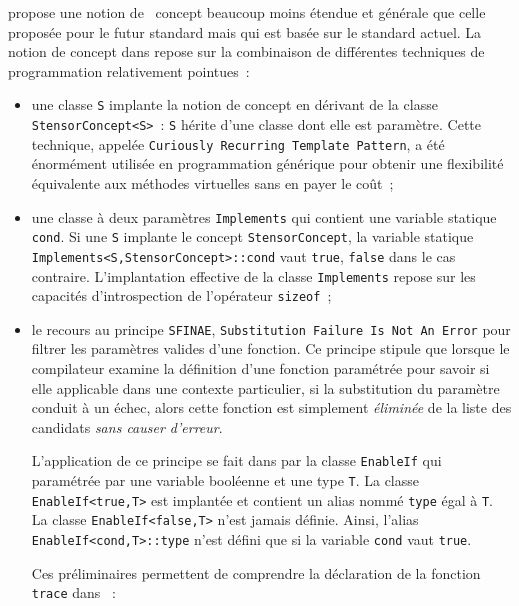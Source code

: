 \documentclass[rectoverso,pleiades,pstricks,leqno,anti]{texmf/note_technique_2010}
\newcommand{\tfel}[1]{\index{tfel}{#1}{\texttt{#1}}}
\newcommand{\varcpp}[1]{\texttt{#1}}
\begin{document}
\tfel{} propose une notion de \og~concept\fg{} beaucoup moins étendue et
générale que celle proposée pour le futur standard mais qui est basée
sur le standard actuel. La notion de concept dans \tfel{} repose sur la
combinaison de différentes techniques de programmation relativement
pointues~:
\begin{itemize}
  \item une classe \texttt{S} implante la notion de concept en dérivant
  de la classe \texttt{StensorConcept<S>}~: \texttt{S} hérite d'une
  classe dont elle est paramètre. Cette technique, appelée
  \texttt{Curiously Recurring Template Pattern}, a été énormément
  utilisée en programmation générique pour obtenir une flexibilité
  équivalente aux méthodes virtuelles sans en payer le coût~;
  \item une classe à deux paramètres \texttt{Implements} qui contient
  une variable statique \varcpp{cond}. Si une \texttt{S} implante le
  concept \texttt{StensorConcept}, la variable statique
  \texttt{Implements<S,StensorConcept>::cond} vaut \texttt{true},
  \texttt{false} dans le cas contraire. L'implantation effective de la
  classe \texttt{Implements} repose sur les capacités d'introspection de
  l'opérateur \texttt{sizeof}~;
  \item le recours au principe \texttt{SFINAE}, \texttt{Substitution
    Failure Is Not An Error} pour filtrer les paramètres valides d'une
  fonction. Ce principe stipule que lorsque le compilateur examine la
  définition d'une fonction paramétrée pour savoir si elle applicable
  dans une contexte particulier, si la substitution du paramètre conduit
  à un échec, alors cette fonction est simplement {\em éliminée} de la
  liste des candidats {\em sans causer d'erreur}.

  L'application de ce principe se fait dans \tfel{} par la classe
  \texttt{EnableIf} qui paramétrée par une variable booléenne et une
  type \texttt{T}. La classe \texttt{EnableIf<true,T>} est implantée
  et contient un alias nommé \texttt{type} égal à \texttt{T}. La
  classe \texttt{EnableIf<false,T>} n'est jamais définie. Ainsi,
  l'alias \texttt{EnableIf<cond,T>::type} n'est défini que si la
  variable \texttt{cond} vaut \texttt{true}.

  Ces préliminaires permettent de comprendre la déclaration de la
  fonction \texttt{trace} dans \tfel{}~:


\end{itemize}
\end{document}
